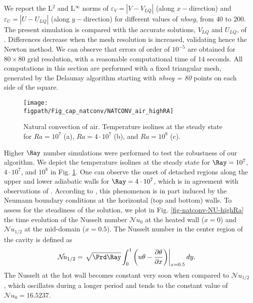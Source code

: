 \noindent We report the L$^2$ and L$^{\infty}$ norms of $\varepsilon_V = |V - V_{LQ}|$ (along $x-$direction)  and $\varepsilon_U = |U - U_{LQ}|$ (along $y-$direction) for different values of {\em nbseg}, from $40$ to $200$. 
The present simulation is compared with the accurate solutions, $V_{LQ}$ and $U_{LQ}$, of \cite{LeQuere91}.
Differences decrease when the mesh resolution is increased, validating hence the Newton method.
We can observe that errors of order of $10^{-5}$ are obtained for $80 \times 80$ grid resolution, with a reasonable computational time of $14$ seconds.
All computations in this section are performed with a fixed triangular mesh, generated by the Delaunay algorithm starting with {\em nbseg = 80} points on each side of the square.


\begin{figure}
	\begin{center}
		\texttt{[image: \\figpath/Fig\_cap\_natconv/NATCONV\_air\_highRA]} 
	\end{center}
	\caption{Natural convection of air. Temperature isolines at the steady state for $Ra = 10^7$ (a), $Ra = 4 \cdot 10^7$ (b), and  $Ra = 10^8$ (c).}
	\label{fig-natconv-T-highRa}
\end{figure}

Higher $\Ray$ number simulations were performed to test the robustness of our algorithm.
We depict the temperature isolines at the steady state for $\Ray = 10^7$, $4 \cdot 10^7$, and $10^8$ in Fig. \ref{fig-natconv-T-highRa}.
One can observe the onset of detached regions along the upper and lower adiabatic walls for $\Ray = 4 \cdot 10^7$, which is in agreement with observations of \cite{le1985computation}.
According to \cite{le1985computation}, this phenomenon is in part induced by the Neumann boundary conditions at the horizontal (top and bottom) walls.
To assess for the steadiness of the solution, we plot in Fig. \ref{fig-natconv-NU-highRa} the time evolution of the Nusselt number $\mathcal{N}\!u_0$ at the heated wall ($x=0$) and $\mathcal{N}\!u_{1/2}$ at the mid-domain ($x=0.5$).
The Nusselt number in the center region of the cavity is defined as
\begin{equation}
	\mathcal{N}\!u_{1/2} =  \left.  \sqrt{\Prd \Ray} \int_0^1 \left( u \theta - \frac{\partial \theta}{\partial x}  \right)\right |_{x=0.5} dy.
\end{equation}
The Nusselt at the hot wall becomes constant very soon when compared to $\mathcal{N}\!u_{1/2}$, which oscillates during a longer period and tends to the constant value of $\mathcal{N}\!u_{0} = 16.5237$.


